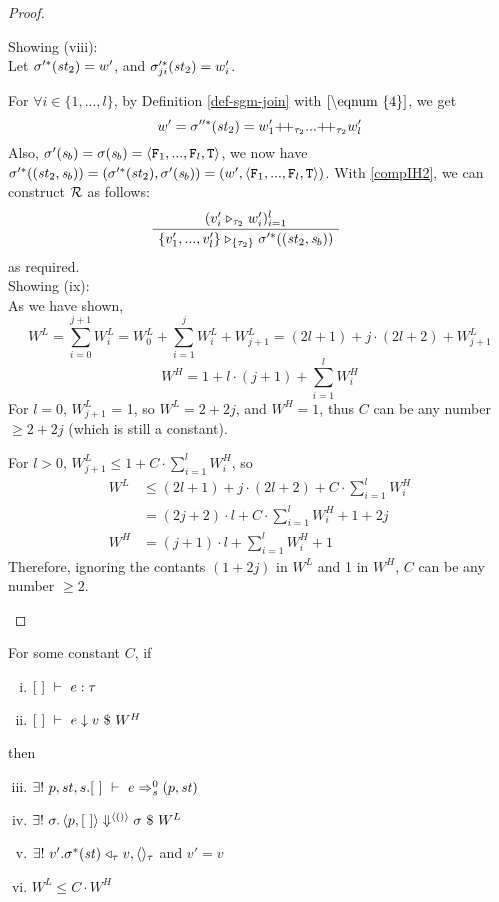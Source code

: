 \begin{proof}
\begin{itemize}
\begin{enumerate}[(i)]
\begin{itemize}
    
	Showing (viii):  \\
	Let $\sigma'^*(\mathit{st}_2) = w'$, and $\sigma'^*_{ji}(\mathit{st}_2) = w'_i$. 
	 
	For $\forall i \in \{1,...,l\}$, by Definition \ref{def-sgm-join} with $\eqref{\eqnum{4}}$, we get
	$$w' = \sgm''^*(\st_2) = w'_1 {\++}_{\tau_2} ... {\++}_{\tau_2} w'_l$$
	Also, $\sgm'(\s_b) = \sgm(\s_b) = \stwo$,
	we now have $\sgm'^*((\st_2,\s_b)) = (\sgm'^*(\st_2),\sgm'(\s_b)) = (w',\stwo)$. 
	With \eqref{compIH2}, we can construct $\mathcal{R}$ as follows:
	$$\PT{
		\AC{(\ValRep{v'_i}{\tau_2}{w'_i})^l_{i=1}}
		\UC{\ValRep{\Seql{v'}}{\tseq{\tau_2}}{\sgm'^*((\st_2,\s_b))}}
	}$$ as required. \\
	
	Showing (ix): \\
	As we have shown, $$W^L =  \sum_{i=0}^{j+1} W^L_i = W^L_0 + \sum_{i=1}^{j}W^L_i + W^L_{j+1} = (2l+1) +  j\cdot (2l+2) + W^L_{j+1} $$
	$$W^H = 1+ l \cdot (j+1) + \sum_{i=1}^{l} W^H_i$$ 
	For $l=0$, $W^L_{j+1}$ = 1,  so $W^L  = 2 + 2j$, and $W^H = 1 $, thus $C$ can be any number $ \ge 2+2j$ (which is still a constant).
    	 
	For $l>0$, $W^L_{j+1} \le 1 + C \cdot \sum_{i=1}^{l}W^H_i$, so 
	\begin{align*}
		W^L  & \le (2l+1) + j\cdot (2l+2) + C \cdot   \sum_{i=1}^{l}W^H_i \\
		& =   (2j+2) \cdot l + C \cdot   \sum_{i=1}^{l}W^H_i  + 1 + 2j \\
		W^H & = (j+1) \cdot l + \sum_{i=1}^{l} W^H_i + 1
	\end{align*}
   Therefore, ignoring the contants $(1+2j)$ in $W^L$ and 1 in $W^H$,  $C $ can be any number $\ge 2$.
	
	\end{itemize}

	\end{enumerate}

	\end{itemize}	
\end{proof}


\begin{cor}
	For some constant $C$, if 
	\begin{enumerate}[(i)]
		\item $[\ ] \ \vdash\  e : \tau$
		\item $\Eval{[\ ]}{e}{v}{W^H}$
	\end{enumerate}
then 
\begin{enumerate}[(i)]
	\setcounter{enumi}{2}
	\item $\exists! \ p,st,s . \Trans{[\ ]}{e}{0}{s}{(p,\st)}$
	\item $\exists! \ \sgm. \seval{p}{[\ ]}{\vunit}{\sgm}{W^L} $
	\item $\exists! \ v'. \sigma^*(\mathit{st}) \mathrel{\triangleleft_{\tau}} v,\langle \rangle_{\tau} $ and $v' = v$
	\item $ W^L \le C \cdot W^H$ 
	 
\end{enumerate}
\end{cor}

